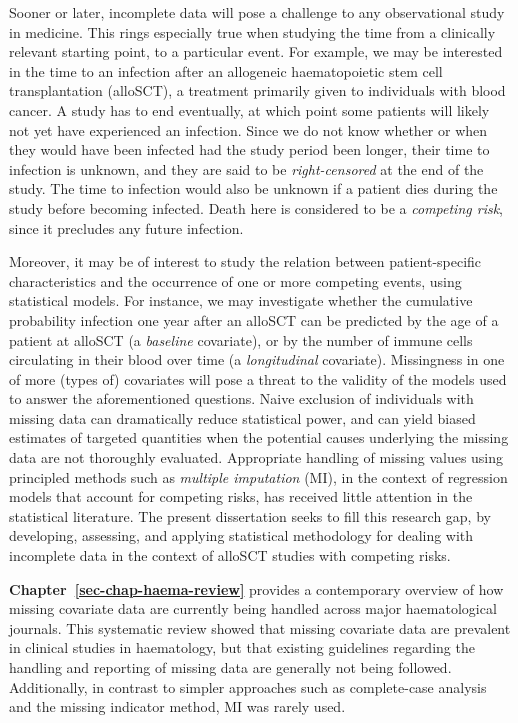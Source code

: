 \documentclass[
  letterpaper,
  paper=240mm:170mm,
  twoside=true,
  open=right,
  fontsize=10pt,
  pagesize=false,
  BCOR=15mm,
  DIV=14,
  headinclude=true,
  footinclude=false,
  headsepline=on]{scrbook}
\begin{document}
Sooner or later, incomplete data will pose a challenge to any
observational study in medicine. This rings especially true when
studying the time from a clinically relevant starting point, to a
particular event. For example, we may be interested in the time to an
infection after an allogeneic haematopoietic stem cell transplantation
(alloSCT), a treatment primarily given to individuals with blood cancer.
A study has to end eventually, at which point some patients will likely
not yet have experienced an infection. Since we do not know whether or
when they would have been infected had the study period been longer,
their time to infection is unknown, and they are said to be
\emph{right-censored} at the end of the study. The time to infection
would also be unknown if a patient dies during the study before becoming
infected. Death here is considered to be a \emph{competing risk}, since
it precludes any future infection.

Moreover, it may be of interest to study the relation between
patient-specific characteristics and the occurrence of one or more
competing events, using statistical models. For instance, we may
investigate whether the cumulative probability infection one year after
an alloSCT can be predicted by the age of a patient at alloSCT (a
\emph{baseline} covariate), or by the number of immune cells circulating
in their blood over time (a \emph{longitudinal} covariate). Missingness
in one of more (types of) covariates will pose a threat to the validity
of the models used to answer the aforementioned questions. Naive
exclusion of individuals with missing data can dramatically reduce
statistical power, and can yield biased estimates of targeted quantities
when the potential causes underlying the missing data are not thoroughly
evaluated. Appropriate handling of missing values using principled
methods such as \emph{multiple imputation} (MI), in the context of
regression models that account for competing risks, has received little
attention in the statistical literature. The present dissertation seeks
to fill this research gap, by developing, assessing, and applying
statistical methodology for dealing with incomplete data in the context
of alloSCT studies with competing risks.

\textbf{Chapter~\ref{sec-chap-haema-review}} provides a contemporary
overview of how missing covariate data are currently being handled
across major haematological journals. This systematic review showed that
missing covariate data are prevalent in clinical studies in haematology,
but that existing guidelines regarding the handling and reporting of
missing data are generally not being followed. Additionally, in contrast
to simpler approaches such as complete-case analysis and the missing
indicator method, MI was rarely used.
\end{document}
